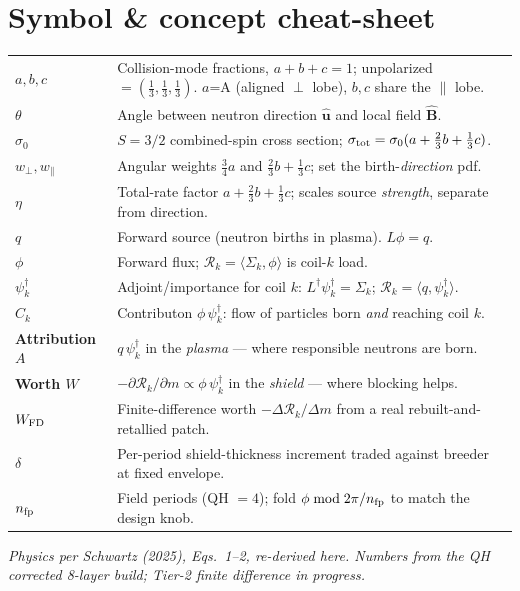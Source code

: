 \documentclass[11pt]{article}
\newcommand{\Bhat}{\hat{\mathbf{B}}}
\newcommand{\uu}{\hat{\mathbf{u}}}
\newcommand{\psid}{\psi^{\dagger}}
\newcommand{\R}{\mathcal{R}}
\begin{document}
\section{Symbol \& concept cheat-sheet}

\newcommand{\gi}[2]{\textbf{#1} & #2 \\}
\begin{tabular}{@{}p{3.2cm}p{12.2cm}@{}}
\gi{$a,b,c$}{Collision-mode fractions, $a+b+c=1$; unpolarized $=(\tfrac13,\tfrac13,\tfrac13)$. $a$=A (aligned $\perp$ lobe), $b,c$ share the $\parallel$ lobe.}
\gi{$\theta$}{Angle between neutron direction $\uu$ and local field $\Bhat$.}
\gi{$\sigma_0$}{$S=3/2$ combined-spin cross section; $\sigma_{\rm tot}=\sigma_0(a+\tfrac23 b+\tfrac13 c)$.}
\gi{$w_\perp,w_\parallel$}{Angular weights $\tfrac34 a$ and $\tfrac23 b+\tfrac13 c$; set the birth-\emph{direction} pdf.}
\gi{$\eta$}{Total-rate factor $a+\tfrac23 b+\tfrac13 c$; scales source \emph{strength}, separate from direction.}
\gi{$q$}{Forward source (neutron births in plasma). $L\phi=q$.}
\gi{$\phi$}{Forward flux; $\R_k=\langle\Sigma_k,\phi\rangle$ is coil-$k$ load.}
\gi{$\psid_k$}{Adjoint/importance for coil $k$: $L^\dagger\psid_k=\Sigma_k$; $\R_k=\langle q,\psid_k\rangle$.}
\gi{$C_k$}{Contributon $\phi\,\psid_k$: flow of particles born \emph{and} reaching coil $k$.}
\gi{Attribution $A$}{$q\,\psid_k$ in the \emph{plasma} --- where responsible neutrons are born.}
\gi{Worth $W$}{$-\partial\R_k/\partial m \propto \phi\,\psid_k$ in the \emph{shield} --- where blocking helps.}
\gi{$W_{\rm FD}$}{Finite-difference worth $-\Delta\R_k/\Delta m$ from a real rebuilt-and-retallied patch.}
\gi{$\delta$}{Per-period shield-thickness increment traded against breeder at fixed envelope.}
\gi{$n_{\rm fp}$}{Field periods (QH $=4$); fold $\phi\bmod 2\pi/n_{\rm fp}$ to match the design knob.}
\end{tabular}

\vfill
\begin{center}\small\itshape
Physics per Schwartz (2025), Eqs.~1--2, re-derived here. Numbers from the QH corrected 8-layer
build; Tier-2 finite difference in progress.
\end{center}
\end{document}
